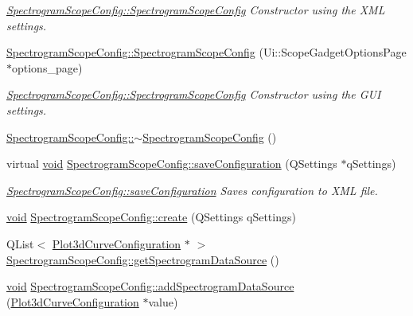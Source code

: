 \begin{DoxyCompactItemize}
\begin{DoxyCompactList}\small\item\em \hyperlink{group___scope_plugin_ga28b2d6eb7e9d8b459d67cef767b92fc5}{\-Spectrogram\-Scope\-Config\-::\-Spectrogram\-Scope\-Config} \-Constructor using the \-X\-M\-L settings. \end{DoxyCompactList}\item 
\hyperlink{group___scope_plugin_ga40e298cc36738756669408e5cb4d4166}{\-Spectrogram\-Scope\-Config\-::\-Spectrogram\-Scope\-Config} (\-Ui\-::\-Scope\-Gadget\-Options\-Page $\ast$options\-\_\-page)
\begin{DoxyCompactList}\small\item\em \hyperlink{group___scope_plugin_ga28b2d6eb7e9d8b459d67cef767b92fc5}{\-Spectrogram\-Scope\-Config\-::\-Spectrogram\-Scope\-Config} \-Constructor using the \-G\-U\-I settings. \end{DoxyCompactList}\item 
\hyperlink{group___scope_plugin_ga12537968c75d08027a1490766226d871}{\-Spectrogram\-Scope\-Config\-::$\sim$\-Spectrogram\-Scope\-Config} ()
\item 
virtual \hyperlink{group___u_a_v_objects_plugin_ga444cf2ff3f0ecbe028adce838d373f5c}{void} \hyperlink{group___scope_plugin_ga11e36d400c5929b6feb7c6e2fb0ba30f}{\-Spectrogram\-Scope\-Config\-::save\-Configuration} (\-Q\-Settings $\ast$q\-Settings)
\begin{DoxyCompactList}\small\item\em \hyperlink{group___scope_plugin_ga11e36d400c5929b6feb7c6e2fb0ba30f}{\-Spectrogram\-Scope\-Config\-::save\-Configuration} \-Saves configuration to \-X\-M\-L file. \end{DoxyCompactList}\item 
\hyperlink{group___u_a_v_objects_plugin_ga444cf2ff3f0ecbe028adce838d373f5c}{void} \hyperlink{group___scope_plugin_ga764cb2be26dd64d438f6ff61da3f1c92}{\-Spectrogram\-Scope\-Config\-::create} (\-Q\-Settings q\-Settings)
\item 
\-Q\-List$<$ \hyperlink{struct_plot3d_curve_configuration}{\-Plot3d\-Curve\-Configuration} $\ast$ $>$ \hyperlink{group___scope_plugin_ga0f006cce4d464191ee21a19fad8c8ee1}{\-Spectrogram\-Scope\-Config\-::get\-Spectrogram\-Data\-Source} ()
\item 
\hyperlink{group___u_a_v_objects_plugin_ga444cf2ff3f0ecbe028adce838d373f5c}{void} \hyperlink{group___scope_plugin_ga7c459607813f5554b33051a7a8bc0e24}{\-Spectrogram\-Scope\-Config\-::add\-Spectrogram\-Data\-Source} (\hyperlink{struct_plot3d_curve_configuration}{\-Plot3d\-Curve\-Configuration} $\ast$value)

\end{DoxyCompactItemize}
